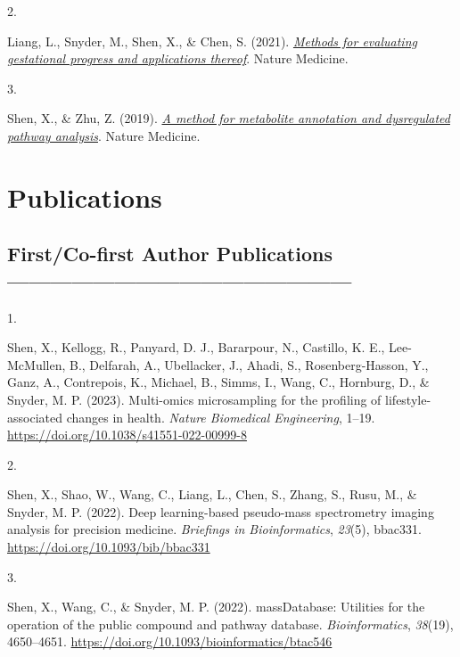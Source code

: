 \documentclass[11pt,a4paper,]{moderncv}
\newlength{\csllabelwidth}
\newcommand{\CSLLeftMargin}[1]{\parbox[t]{\csllabelwidth}{#1}}
\newcommand{\CSLRightInline}[1]{\parbox[t]{\linewidth - \csllabelwidth}{#1}}
\begin{document}
\leavevmode{}%
\CSLLeftMargin{2. }%
\CSLRightInline{Liang, L., Snyder, M., Shen, X., \& Chen, S. (2021).
\emph{\href{}{Methods for evaluating gestational progress and
applications thereof}}. Nature Medicine.}

\leavevmode{}%
\CSLLeftMargin{3. }%
\CSLRightInline{Shen, X., \& Zhu, Z. (2019). \emph{\href{}{A method for
metabolite annotation and dysregulated pathway analysis}}. Nature
Medicine.}

\hypertarget{publications}{%
\section{Publications}\label{publications}}

\hypertarget{firstco-first-author-publications}{%
\subsection{First/Co-first Author
Publications------------------------------------------------}\label{firstco-first-author-publications}}

\hypertarget{bibliography}{}
\leavevmode{}%
\CSLLeftMargin{1. }%
\CSLRightInline{Shen, X., Kellogg, R., Panyard, D. J., Bararpour, N.,
Castillo, K. E., Lee-McMullen, B., Delfarah, A., Ubellacker, J., Ahadi,
S., Rosenberg-Hasson, Y., Ganz, A., Contrepois, K., Michael, B., Simms,
I., Wang, C., Hornburg, D., \& Snyder, M. P. (2023). Multi-omics
microsampling for the profiling of lifestyle-associated changes in
health. \emph{Nature Biomedical Engineering}, 1--19.
\url{https://doi.org/10.1038/s41551-022-00999-8}}

\leavevmode{}%
\CSLLeftMargin{2. }%
\CSLRightInline{Shen, X., Shao, W., Wang, C., Liang, L., Chen, S.,
Zhang, S., Rusu, M., \& Snyder, M. P. (2022). Deep learning-based
pseudo-mass spectrometry imaging analysis for precision medicine.
\emph{Briefings in Bioinformatics}, \emph{23}(5), bbac331.
\url{https://doi.org/10.1093/bib/bbac331}}

\leavevmode{}%
\CSLLeftMargin{3. }%
\CSLRightInline{Shen, X., Wang, C., \& Snyder, M. P. (2022).
massDatabase: Utilities for the operation of the public compound and
pathway database. \emph{Bioinformatics}, \emph{38}(19), 4650--4651.
\url{https://doi.org/10.1093/bioinformatics/btac546}}
\end{document}
